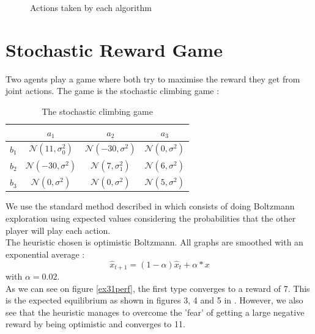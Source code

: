 \documentclass[a4paper]{article}
\begin{document}
\begin{figure}[H]
	\caption{Actions taken by each algorithm}
	\label{ex13a}
\end{figure}

\section{Stochastic Reward Game}
Two agents play a game where both try to maximise the reward they get from
joint actions. The game is the stochastic climbing game :

\begin{table}[H]
\centering
\begin{tabular}{c|c|c|c}
	& $a_1$ & $a_2$ & $a_3$ \\ \hline
	$b_1$ & $\mathcal{N}(11, \sigma_0^2)$ & $\mathcal{N}(-30, \sigma^2)$
		& $\mathcal{N}(0, \sigma^2)$ \\ \hline 
	$b_2$ & $\mathcal{N}(-30, \sigma^2)$ & $\mathcal{N}(7, \sigma_1^2)$
		& $\mathcal{N}(6, \sigma^2)$ \\ \hline 
	$b_3$ & $\mathcal{N}(0, \sigma^2)$ & $\mathcal{N}(0, \sigma^2)$
		& $\mathcal{N}(5, \sigma^2)$ 
\end{tabular}
\caption{The stochastic climbing game}
\label{banditparams}
\end{table}

We use the standard method described in \cite{claus} which consists of doing
Boltzmann exploration using expected values considering the probabilities that
the other player will play each action.\\

The heuristic chosen is optimistic Boltzmann. All graphs are smoothed with
an exponential average :
$$ \widehat{x}_{t+1} = (1-\alpha)\widehat{x}_t + \alpha * x $$
with $\alpha = 0.02$. \\

As we can see on figure \ref{ex31perf}, the first type converges
to a reward of 7. This is the expected equilibrium as shown in figures 3, 4 and
5 in \cite{claus}. However, we also see that the heuristic manages to overcome
the 'fear' of getting a large negative reward by being optimistic and 
converges to 11.\\
\end{document}

